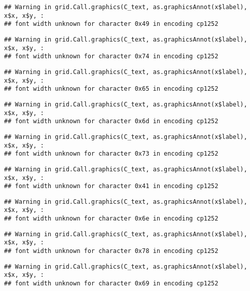 \documentclass[
]{article}
\begin{document}
\begin{verbatim}
## Warning in grid.Call.graphics(C_text, as.graphicsAnnot(x$label), x$x, x$y, :
## font width unknown for character 0x49 in encoding cp1252
\end{verbatim}

\begin{verbatim}
## Warning in grid.Call.graphics(C_text, as.graphicsAnnot(x$label), x$x, x$y, :
## font width unknown for character 0x74 in encoding cp1252
\end{verbatim}

\begin{verbatim}
## Warning in grid.Call.graphics(C_text, as.graphicsAnnot(x$label), x$x, x$y, :
## font width unknown for character 0x65 in encoding cp1252
\end{verbatim}

\begin{verbatim}
## Warning in grid.Call.graphics(C_text, as.graphicsAnnot(x$label), x$x, x$y, :
## font width unknown for character 0x6d in encoding cp1252
\end{verbatim}

\begin{verbatim}
## Warning in grid.Call.graphics(C_text, as.graphicsAnnot(x$label), x$x, x$y, :
## font width unknown for character 0x73 in encoding cp1252
\end{verbatim}

\begin{verbatim}
## Warning in grid.Call.graphics(C_text, as.graphicsAnnot(x$label), x$x, x$y, :
## font width unknown for character 0x41 in encoding cp1252
\end{verbatim}

\begin{verbatim}
## Warning in grid.Call.graphics(C_text, as.graphicsAnnot(x$label), x$x, x$y, :
## font width unknown for character 0x6e in encoding cp1252
\end{verbatim}

\begin{verbatim}
## Warning in grid.Call.graphics(C_text, as.graphicsAnnot(x$label), x$x, x$y, :
## font width unknown for character 0x78 in encoding cp1252
\end{verbatim}

\begin{verbatim}
## Warning in grid.Call.graphics(C_text, as.graphicsAnnot(x$label), x$x, x$y, :
## font width unknown for character 0x69 in encoding cp1252
\end{verbatim}
\end{document}
